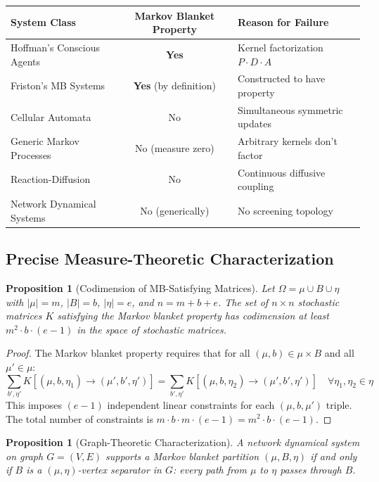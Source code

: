 \documentclass[11pt,a4paper]{article}
\theoremstyle{definition}
\theoremstyle{plain}
\newtheorem{proposition}[definition]{Proposition}
\theoremstyle{remark}
\begin{document}
\begin{center}
\begin{tabular}{lcp{6cm}}
\toprule
\textbf{System Class} & \textbf{Markov Blanket Property} & \textbf{Reason for Failure} \\
\midrule
Hoffman's Conscious Agents & \textbf{Yes} & Kernel factorization $P \cdot D \cdot A$ \\
Friston's MB Systems & \textbf{Yes} (by definition) & Constructed to have property \\
Cellular Automata & No & Simultaneous symmetric updates \\
Generic Markov Processes & No (measure zero) & Arbitrary kernels don't factor \\
Reaction-Diffusion & No & Continuous diffusive coupling \\
Network Dynamical Systems & No (generically) & No screening topology \\
\bottomrule
\end{tabular}
\end{center}

\subsection{Precise Measure-Theoretic Characterization}

\begin{proposition}[Codimension of MB-Satisfying Matrices]\label{prop:codimension}
Let $\Omega = \mu \cup B \cup \eta$ with $|\mu| = m$, $|B| = b$, $|\eta| = e$, and $n = m + b + e$. The set of $n \times n$ stochastic matrices $K$ satisfying the Markov blanket property has codimension at least $m^2 \cdot b \cdot (e-1)$ in the space of stochastic matrices.
\end{proposition}

\begin{proof}
The Markov blanket property requires that for all $(\mu, b) \in \mu \times B$ and all $\mu' \in \mu$:
\[
\sum_{b', \eta'} K[(\mu, b, \eta_1) \to (\mu', b', \eta')] = \sum_{b', \eta'} K[(\mu, b, \eta_2) \to (\mu', b', \eta')] \quad \forall \eta_1, \eta_2 \in \eta
\]
This imposes $(e-1)$ independent linear constraints for each $(\mu, b, \mu')$ triple. The total number of constraints is $m \cdot b \cdot m \cdot (e-1) = m^2 \cdot b \cdot (e-1)$.
\end{proof}

\begin{proposition}[Graph-Theoretic Characterization]\label{prop:graph-separator}
A network dynamical system on graph $G = (V, E)$ supports a Markov blanket partition $(\mu, B, \eta)$ if and only if $B$ is a $(\mu, \eta)$-vertex separator in $G$: every path from $\mu$ to $\eta$ passes through $B$.
\end{proposition}
\end{document}

